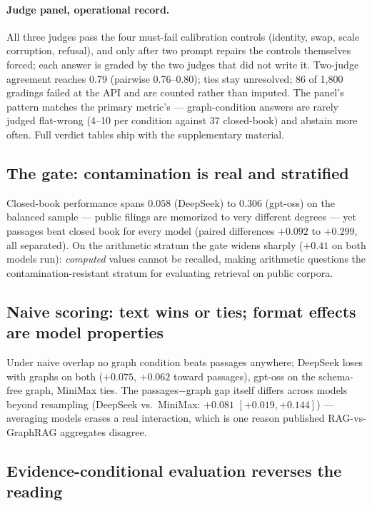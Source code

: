 \documentclass{article}
\begin{document}
\paragraph{Judge panel, operational record.} All three judges pass the
four must-fail calibration controls (identity, swap, scale corruption,
refusal), and only after two prompt repairs the controls themselves
forced; each answer is graded by the two judges that did not write it.
Two-judge agreement reaches 0.79 (pairwise 0.76--0.80); ties stay
unresolved; 86 of 1,800 gradings failed at the API and are counted rather
than imputed. The panel's pattern matches the primary metric's ---
graph-condition answers are rarely judged flat-wrong (4--10 per condition
against 37 closed-book) and abstain more often. Full verdict tables ship
with the supplementary material.

\subsection{The gate: contamination is real and stratified}

Closed-book performance spans $0.058$ (DeepSeek) to $0.306$ (gpt-oss) on the
balanced sample --- public filings are memorized to very different degrees
--- yet passages beat closed book for every model (paired differences
$+0.092$ to $+0.299$, all separated). On the arithmetic stratum the gate
widens sharply ($+0.41$ on both models run): \emph{computed} values cannot be
recalled, making arithmetic questions the contamination-resistant stratum
for evaluating retrieval on public corpora.

\subsection{Naive scoring: text wins or ties; format effects are model
properties}

Under naive overlap no graph condition beats passages anywhere; DeepSeek
loses with graphs on both ($+0.075$, $+0.062$ toward passages), gpt-oss on
the schema-free graph, MiniMax ties. The passages$-$graph gap itself differs
across models beyond resampling (DeepSeek vs.\ MiniMax: $+0.081$ $[+0.019,
+0.144]$) --- averaging models erases a real interaction, which is one
reason published RAG-vs-GraphRAG aggregates disagree.

\subsection{Evidence-conditional evaluation reverses the reading}
\end{document}
